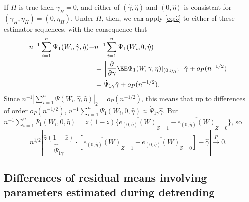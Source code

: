 If $H$ is true then $\gamma_{H}=0$, and either of $(\hat\gamma,
\hat\eta)$ and $(0, \hat\eta)$  is consistent for $(\gamma_H,
\eta_H) = (0, \eta_{H})$.  Under $H$, then, we can apply \eqref{eq:3}
to either of these estimator sequences, with the consequence that
\begin{align*}
n^{-1}\sum_{i=1}^n \Psi_1(W_i, \hat{\gamma}, \hat{\eta}) - &
                                                             n^{-1}\sum_{i=1}^n \Psi_1(W_i, 0, \hat{\eta})\\
&= \left[\frac{\partial}{\partial\gamma} \EE \Psi_{1}(W,\gamma, \eta)|_{(0, \eta_{H})}\right] \hat{\gamma} + o_{P}(n^{-1/2}) \\
&= {\dot{\Psi}}_{1\gamma} \hat{\gamma} + o_{P}(n^{-1/2}) .\\
\end{align*}
Since $n^{-1}|\sum_{i=1}^n \Psi(W_i, \hat{\gamma}, \hat{\eta})|_{2} =
o_{P}(n^{-1/2})$, this means that up to differences of order
$o_{P}(n^{-1/2})$, $n^{-1}\sum_{i=1}^n \Psi_1(W_i, 0, \hat{\eta})
\approx  \dot{\Psi}_{1 \gamma} \hat\gamma$.  But
$n^{-1}\sum_{i=1}^n \Psi_1(W_i, 0, \hat{\eta}) =
\bar{z}(1-\bar{z})\{\overline{e_{(0,\hat\eta)}(W)}_{Z=1} -
\overline{e_{(0,\hat\eta)}(W)}_{Z=0}\}$, so
\begin{equation*}
n^{1/2}\left| \frac{\bar{z}(1-\bar{z})}{\hat{\dot{\Psi}}_{1\gamma} }
\cdot
\left[
\overline{e_{(0,\hat\eta)}(W)}_{Z=1} -
\overline{e_{(0,\hat\eta)}(W)}_{Z=0} \right]
- \hat\gamma \right|
\stackrel{P}{\rightarrow} 0.
\end{equation*}

\subsection{Differences of residual means involving parameters estimated during detrending}
\label{apnd:requ-forpr-eqref}


